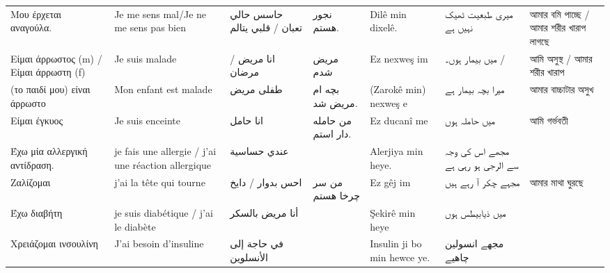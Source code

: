 \begin{longtable}{p{3.5cm} p{3.5cm} p{3.5cm} p{3.5cm} p{3.5cm} p{3.5cm} p{3.5cm} }
 Μου έρχεται αναγούλα.                  & Je me sens mal/Je ne me sens pas bien               & حاسس حالي تعبان /  قلبي يتالم        & نجور هستم.                               & Dilê min dixelê.                            & میری طبعیت ٹھیک نہیں ہے           & আমার বমি পাচ্ছে / আমার শরীর খারাপ লাগছে \\
 Eίμαι άρρωστος (m) / Είμαι άρρωστη (f) & Je suis malade                                      & انا مریض        / مرضان              & مریض شدم                                 & Ez nexweş im                                & میں بیمار ہوں۔ /                  & আমি অসুস্থ / আমার শরীর খারাপ            \\
 (το παιδί μου) είναι άρρωστο           & Mon enfant est malade                               & طفلی مریض                            & بچه ام مریض شد.                          & (Zarokê min) nexweş e                       & میرا بچہ بیمار ہے                 & আমার বাচ্চাটার অসুখ                     \\
 Είμαι έγκυος                           & Je suis enceinte                                    & انا حامل                             & من حامله دار استم.                       & Ez ducanî me                                & میں حاملہ ہوں                     & আমি গর্ভবতী                             \\
 Έχω μία αλλεργική αντίδραση.           & je fais une allergie / j'ai une réaction allergique & عندي   حساسية                        &                                          & Alerjiya min heye.                          & مجھے اس کی وجہ سے الرجی ہو رہی ہے &                                         \\
 Ζαλίζομαι                              & j'ai la tête qui tourne                             & احس بدوار        / دايخ              & من  سر چرخا هستم                         & Ez gêj im                                   & مجہے چکر آ  رہے ہیں               & আমার মাথা ঘুরছে                         \\
 Έχω διαβήτη                            & je suis diabétique / j'ai le diabète                & أنا مريض بالسكر                      &                                          & Şekirê min heye                             & میں ذیابیطس ہوں                   &                                         \\
 Χρειάζομαι ινσουλίνη                   & J'ai besoin d'insuline                              & في حاجة إلى الأنسلوين                &                                          & Insulin ji bo min hewce ye.                 & مجھے انسولین چاھیے                &                                         \\

\end{longtable}
